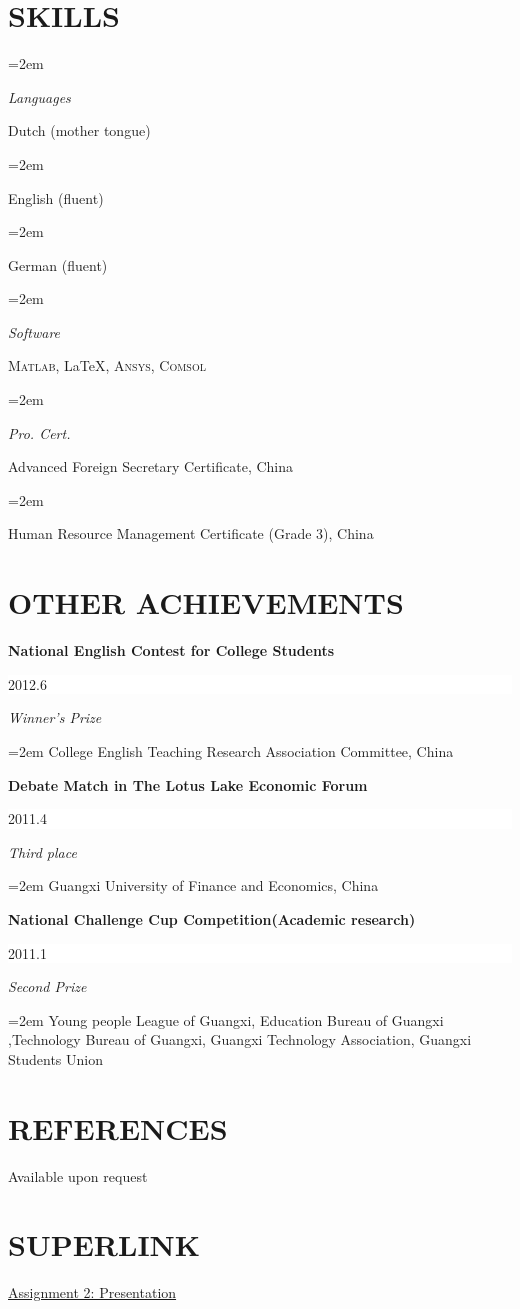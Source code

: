 \documentclass[paper=a4,fontsize=11.5pt]{scrartcl}
\newlength{\spacebox}
\newcommand{\sepspace}{\vspace*{1em}}
\newcommand{\NewPart}[1]{\section*{\uppercase{#1}}}
\newcommand{\SkillsEntry}[2]{
	\noindent\hangindent=2em\hangafter=0
	\parbox{\spacebox}{\textit{#1}}\hspace{1.5em} #2 \par}
\newcommand{\EducationEntry}[4]{
	\noindent \textbf{#1} 
	\hfill\colorbox{White}{
		\parbox{6em}{\hfill\color{Black}#2}}
	\par\noindent\textit{#3}
	\par\noindent\hangindent=2em\hangafter=0 
	\small #4\normalsize \par}
\begin{document}
\NewPart{Skills}{}

\SkillsEntry{Languages}{Dutch (mother tongue)}
\SkillsEntry{}{English (fluent)}
\SkillsEntry{}{German (fluent)} \sepspace

\SkillsEntry{Software}{\textsc{Matlab}, \LaTeX, \textsc{Ansys}, \textsc{Comsol}}\sepspace

\SkillsEntry{Pro. Cert.}{Advanced Foreign Secretary Certificate, China}

\SkillsEntry{}{Human Resource Management Certificate (Grade 3), China}

\NewPart{Other Achievements}{}

\EducationEntry{National English Contest for College Students}{2012.6}{Winner's Prize}{College English Teaching Research Association Committee, China}
\sepspace
\EducationEntry{Debate Match in The Lotus Lake Economic Forum}{2011.4}{Third place}{Guangxi University of Finance and Economics, China}
\sepspace
\EducationEntry{National Challenge Cup Competition(Academic research)}{2011.1}{Second Prize}{Young people League of Guangxi, Education Bureau of Guangxi ,Technology Bureau of Guangxi, Guangxi Technology Association, Guangxi Students Union}
\sepspace
\NewPart{References}
Available upon request
\NewPart{Superlink}
\href{http://littleskyline.github.io/second-repo/NoCss.html}{Assignment 2: Presentation}
\end{document}
